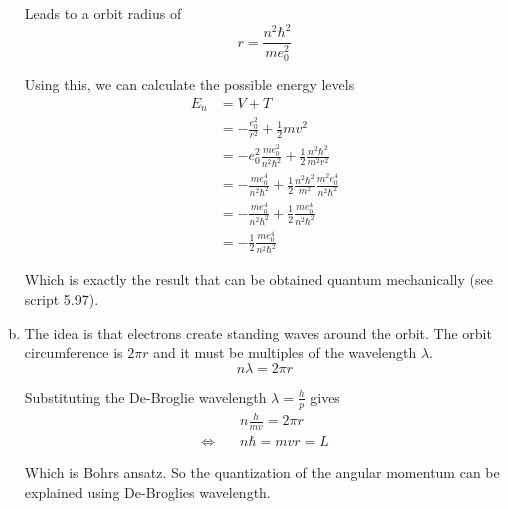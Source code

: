 \documentclass[a4paper,german,12pt,smallheadings]{scrartcl}
\begin{document}
\begin{enumerate}[a)]
    Leads to a orbit radius of
    \begin{equation*}
      r = \frac{n^2\hbar^2}{me_0^2}
    \end{equation*}

    Using this, we can calculate the possible energy levels
    \begin{align*}
      E_n &= V + T \\
          &= -\frac{e_0^2}{r^2} + \frac{1}{2} m v^2 \\
          &= -e_0^2 \frac{me_0^2}{n^2 \hbar^2} + \frac{1}{2} \frac{n^2 \hbar^2}{m^2 r^2} \\
          &= -\frac{me_0^4}{n^2 \hbar^2} + \frac{1}{2} \frac{n^2 \hbar^2}{m^2} \frac{m^2e_0^4}{n^2 \hbar^2} \\
          &= -\frac{me_0^4}{n^2 \hbar^2} + \frac{1}{2} \frac{me_0^4}{n^2 \hbar^2} \\
          &= -\frac{1}{2} \frac{me_0^4}{n^2 \hbar^2}
    \end{align*}

    Which is exactly the result that can be obtained quantum mechanically (see
    script 5.97).

  \item
    The idea is that electrons create standing waves around the orbit. The
    orbit circumference is $2 \pi r$ and it must be multiples of the wavelength
    $\lambda$.
    \begin{equation*}
      n \lambda = 2 \pi r
    \end{equation*}

    Substituting the De-Broglie wavelength $\lambda = \frac{h}{p}$ gives
    \begin{align*}
                           &n \frac{h}{mv} = 2 \pi r \\
      \Leftrightarrow\quad &n \hbar = mvr = L
    \end{align*}

    Which is Bohrs ansatz. So the quantization of the angular momentum can be
    explained using De-Broglies wavelength.

\end{enumerate}
\end{document}
